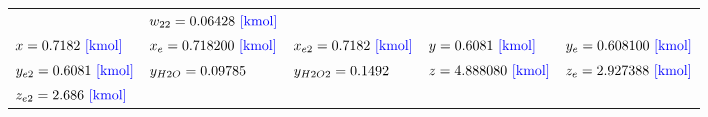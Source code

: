 \documentclass[10pt,fleqn]{article}
\begin{document}
\begin{longtable}{lllll}
{${w =0.128550 \rm\ {\color{blue} \left[kmol\right]}}$ & 
${w_{22} =0.06428 \rm\ {\color{blue} \left[kmol\right]}}$ \\
${x =0.7182 \rm\ {\color{blue} \left[kmol\right]}}$ & 
${x_{e} =0.718200 \rm\ {\color{blue} \left[kmol\right]}}$ & 
${x_{e2} =0.7182 \rm\ {\color{blue} \left[kmol\right]}}$ & 
${y =0.6081 \rm\ {\color{blue} \left[kmol\right]}}$ & 
${y_{e} =0.608100 \rm\ {\color{blue} \left[kmol\right]}}$ \\
${y_{e2} =0.6081 \rm\ {\color{blue} \left[kmol\right]}}$ & 
${y_{H2O} =0.09785 \rm}$ & 
${y_{H2O2} =0.1492 \rm}$ & 
${z =4.888080 \rm\ {\color{blue} \left[kmol\right]}}$ & 
${z_{e} =2.927388 \rm\ {\color{blue} \left[kmol\right]}}$ \\
${z_{e2} =2.686 \rm\ {\color{blue} \left[kmol\right]}}$\end{longtable}
\end{document}
